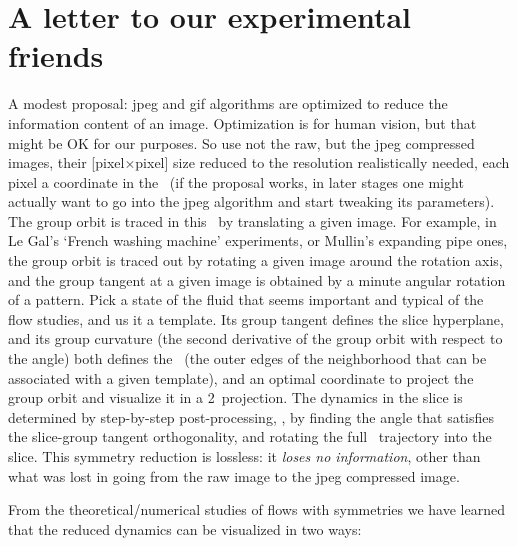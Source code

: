 \section{A letter to our experimental friends}

A modest proposal: jpeg and gif algorithms are optimized to reduce the
information content of an image. Optimization is for human vision, but
that might be OK for our purposes. So use not the raw, but the jpeg
compressed images, their [pixel$\times$pixel] size reduced to the
resolution realistically needed, each pixel a coordinate in the \statesp\
(if the proposal works, in later stages one might actually want to go
into the jpeg algorithm and start tweaking its parameters). The group
orbit is traced in this \statesp\ by translating a given image. For
example, in Le Gal's `French washing machine' experiments, or Mullin's
expanding pipe ones, the group orbit is traced out by rotating a given
image around the rotation axis, and the group tangent at a given image is
obtained by a minute angular rotation of a pattern. Pick a state of the
fluid that seems important and typical of the flow studies, and us it a
template. Its group tangent defines the slice hyperplane, and its group
curvature (the second derivative of the group orbit with respect to the
angle) both defines the \sset\ (the outer edges of the neighborhood that
can be associated with a given template), and an optimal coordinate to
project the group orbit and visualize it in a 2\dmn\ projection. The
dynamics in the slice is determined by step-by-step post-processing, \ie,
by finding the angle that satisfies the slice-group tangent
orthogonality, and rotating the full \statesp\ trajectory into the slice.
This symmetry reduction is lossless: it \emph{loses no information},
other than what was lost in going from the raw image to the jpeg
compressed image.

From the theoretical/numerical studies of flows with symmetries%
\rf{SCD07,ACHKW11}
we have learned that the reduced dynamics can be visualized in two ways:

